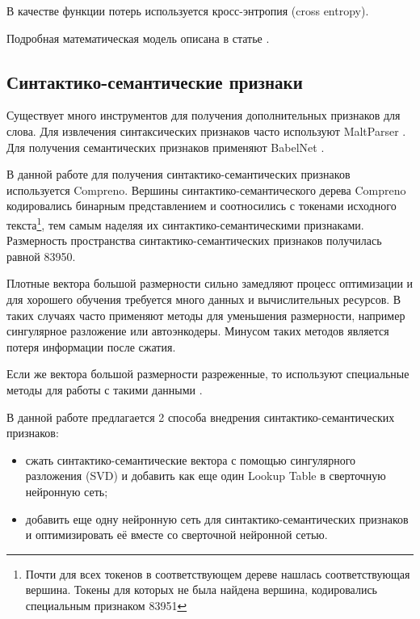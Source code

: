   В качестве функции потерь используется кросс-энтропия (cross entropy).

  Подробная математическая модель описана в статье \citep{collobert2011natural}.

  \subsection{Синтактико-семантические признаки}
    Существует много инструментов для получения дополнительных признаков для слова.
    Для извлечения синтаксических признаков часто используют MaltParser \citep{nivre2006maltparser}.
    Для получения семантических признаков применяют BabelNet \citep{navigli2010babelnet}.

    В данной работе для получения синтактико-семантических признаков используется Compreno.
    Вершины синтактико-семантического дерева Compreno кодировались бинарным представлением
    и соотносились с токенами исходного
    текста\footnote{Почти для всех токенов в соответствующем дереве нашлась соответствующая вершина.
    Токены для которых не была найдена вершина, кодировались специальным признаком 83951},
    тем самым наделяя их синтактико-се\-ман\-ти\-ческими признаками.
    Размерность пространства синтактико-се\-ман\-ти\-ческих признаков получилась равной 83950.

    Плотные вектора большой размерности сильно замедляют процесс оптимизации и для хорошего
    обучения требуется много данных и вычислительных ресурсов.
    В таких случаях часто применяют методы для уменьшения размерности,
    например сингулярное разложение или автоэнкодеры. Минусом таких методов является потеря информации
    после сжатия.

    Если же вектора большой размерности разреженные, то используют специальные методы для
    работы с такими данными \citep{davissurvey}.

    В данной работе предлагается 2 способа внедрения синтактико-семантических признаков:
    \begin{itemize}
      \item сжать синтактико-семантические вектора с помощью сингулярного разложения (SVD) и добавить
      как еще один Lookup Table в сверточную нейронную сеть;
      \item добавить еще одну нейронную сеть для синтактико-семантических признаков и оптимизировать
      её вместе со сверточной нейронной сетью.
    \end{itemize}
